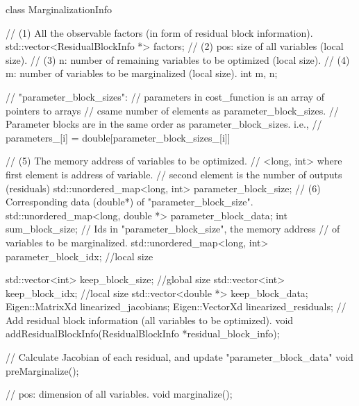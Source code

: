 \documentclass[12pt]{report}   %
\begin{document}
\begin{cppcode}
class MarginalizationInfo {
// (1) All the observable factors (in form of residual block information).
std::vector<ResidualBlockInfo *> factors;
// (2) pos: size of all variables (local size).
// (3) n: number of remaining variables to be optimized (local size).
// (4) m: number of variables to be marginalized (local size).
int m, n;

// "parameter\_block\_sizes":
// parameters in cost\_function is an array of pointers to arrays
// csame number of elements as parameter\_block\_sizes.  
// Parameter blocks are in the same order as parameter\_block\_sizes. i.e.,
//   parameters\_[i] = double[parameter\_block\_sizes\_[i]]

// (5) The memory address of variables to be optimized.
// <long, int> where first element is address of variable.
// second element is the number of outputs (residuals)
std::unordered_map<long, int> parameter_block_size;
// (6) Corresponding data (double*) of "parameter\_block\_size".
std::unordered_map<long, double *> parameter_block_data;
int sum_block_size;
// Ids in "parameter\_block\_size", the memory address
// of variables to be marginalized.
std::unordered_map<long, int> parameter_block_idx; //local size

std::vector<int> keep_block_size; //global size
std::vector<int> keep_block_idx;  //local size
std::vector<double *> keep_block_data;
Eigen::MatrixXd linearized_jacobians;
Eigen::VectorXd linearized_residuals;
// Add residual block information (all variables to be optimized).
void addResidualBlockInfo(ResidualBlockInfo *residual_block_info);

// Calculate Jacobian of each residual, and update "parameter\_block\_data"
void preMarginalize();

// pos: dimension of all variables.
void marginalize();
}
\end{cppcode}
\end{document}
